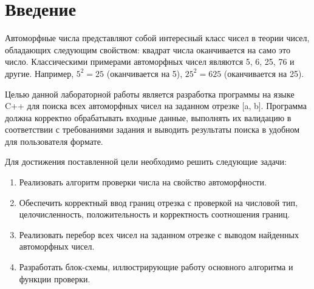 \documentclass[a4paper, 12pt]{report} %
\begin{document}
	\newpage %
	\setcounter{page}{2} %
	\tableofcontents %
	
	\newpage
	
	\chapter*{Введение}
	Автоморфные числа представляют собой интересный класс чисел в теории чисел, обладающих следующим свойством:
	квадрат числа оканчивается на само это число. Классическими примерами автоморфных чисел являются 5, 6, 25, 76 и другие.
	Например, \(5^2 = 25\) (оканчивается на 5), \(25^2 = 625\) (оканчивается на 25).
	
	Целью данной лабораторной работы является разработка программы на языке C++ для поиска всех автоморфных чисел на заданном отрезке [a, b].
	Программа должна корректно обрабатывать входные данные, выполнять их валидацию в соответствии с требованиями задания и выводить
	результаты поиска в удобном для пользователя формате.
	
	Для достижения поставленной цели необходимо решить следующие задачи:
	\begin{enumerate}
		\item Реализовать алгоритм проверки числа на свойство автоморфности.
		\item Обеспечить корректный ввод границ отрезка с проверкой на числовой тип, целочисленность, положительность и корректность соотношения границ.
		\item Реализовать перебор всех чисел на заданном отрезке с выводом найденных автоморфных чисел.
		\item Разработать блок-схемы, иллюстрирующие работу основного алгоритма и функции проверки.
	\end{enumerate}
	\newpage
	
\end{document}
